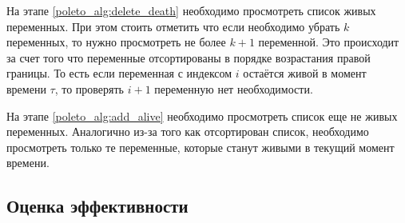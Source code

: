 \documentclass[12pt]{article}
\begin{document}
На этапе \ref{poleto_alg:delete_death} необходимо просмотреть список живых переменных. При этом стоить отметить
что если необходимо убрать $k$ переменных, то нужно просмотреть не более $k+1$ переменной. Это происходит за счет
того что переменные отсортированы в порядке возрастания правой границы. То есть если переменная с индексом $i$
остаётся живой в момент времени $\tau$, то проверять $i + 1$ переменную нет необходимости.

На этапе \ref{poleto_alg:add_alive} необходимо просмотреть список еще не живых переменных. Аналогично
из-за того как отсортирован список, необходимо просмотреть только те переменные, которые станут живыми
в текущий момент времени.




\subsection{Оценка эффективности}
\end{document}
